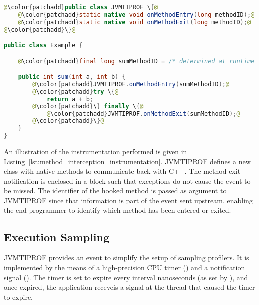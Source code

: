 \medskip
\begin{lstlisting}[language=Java,frame=tb,escapechar=@,captionpos=b,caption=Example instrumentation applied by method interception. Instrumented code is in green. The \code{sum} method is modified such that JVMTIPROF is notified about entries and exits on it.,label=lst:method_interception_instrumentation]
@\color{patchadd}public class JVMTIPROF \{@
    @\color{patchadd}static native void onMethodEntry(long methodID);@
    @\color{patchadd}static native void onMethodExit(long methodID);@
@\color{patchadd}\}@

public class Example {

    @\color{patchadd}final long sumMethodID = /* determined at runtime */;@

    public int sum(int a, int b) {
        @\color{patchadd}JVMTIPROF.onMethodEntry(sumMethodID);@
        @\color{patchadd}try \{@
            return a + b;
        @\color{patchadd}\} finally \{@
            @\color{patchadd}JVMTIPROF.onMethodExit(sumMethodID);@
        @\color{patchadd}\}@
    }
}
\end{lstlisting}

An illustration of the instrumentation performed is given in Listing~\ref{lst:method_interception_instrumentation}. JVMTIPROF defines a new class with native methods to communicate back with C++. The method exit notification is enclosed in a  block such that exceptions do not cause the event to be missed. The identifier of the hooked method is passed as argument to JVMTIPROF since that information is part of the event sent upstream, enabling the end-programmer to identify which method has been entered or exited.





\subsection{Execution Sampling}

JVMTIPROF provides an event to simplify the setup of sampling profilers. It is implemented by the means of a high-precision CPU timer () and a notification signal (). The timer is set to expire every interval nanoseconds (as set by ), and once expired, the application receveis a signal at the thread that caused the timer to expire.

